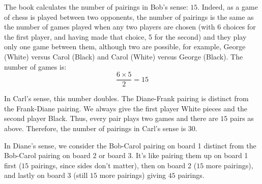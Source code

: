\documentclass[11pt]{book}
\theoremstyle{definition}
\theoremstyle{plain}
\theoremstyle{definition}
\theoremstyle{problemstyle}
\theoremstyle{remark}
\theoremstyle{definition}
\begin{document}
\begin{mybox}
The book calculates the number of pairings in Bob's sense: $15$. Indeed, as a game of chess is played between two opponents, the number of pairings is the same as the number of games played when any two players are chosen (with 6 choices for the first player, and having made that choice, 5 for the second) and they play only one game between them, although two are possible, for example, George (White) versus Carol (Black) and Carol (White) versus George (Black). The number of games is: 
\[
    \frac{6\times 5}{2}=15
\]

In Carl's sense, this number doubles. The Diane-Frank pairing is distinct from the Frank-Diane pairing. We always give the first player White pieces and the second player Black. Thus, every pair plays two games and there are $15$ pairs as above. Therefore, the number of pairings in Carl's sense is $30$.

In Diane's sense, we consider the Bob-Carol pairing on board 1 distinct from the Bob-Carol pairing on board 2 or board 3. It's like pairing them up on board 1 first ($15$ pairings, since sides don't matter), then on board 2 ($15$ more pairings), and lastly on board 3 (still $15$ more pairings) giving $45$ pairings.
    \label{box:wrong-1}
\end{mybox}
\end{document}
